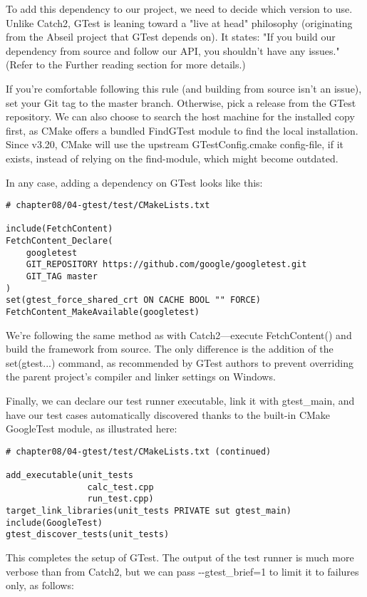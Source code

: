 To add this dependency to our project, we need to decide which version to use. Unlike Catch2, GTest is leaning toward a "live at head" philosophy (originating from the Abseil project that GTest depends on). It states: "If you build our dependency from source and follow our API, you shouldn't have any issues." (Refer to the Further reading section for more details.)

If you're comfortable following this rule (and building from source isn't an issue), set your Git tag to the master branch. Otherwise, pick a release from the GTest repository. We can also choose to search the host machine for the installed copy first, as CMake offers a bundled FindGTest module to find the local installation. Since v3.20, CMake will use the upstream GTestConfig.cmake config-file, if it exists, instead of relying on the find-module, which might become outdated.

In any case, adding a dependency on GTest looks like this:

\begin{lstlisting}[style=styleCMake]
# chapter08/04-gtest/test/CMakeLists.txt

include(FetchContent)
FetchContent_Declare(
	googletest
	GIT_REPOSITORY https://github.com/google/googletest.git
	GIT_TAG master
)
set(gtest_force_shared_crt ON CACHE BOOL "" FORCE)
FetchContent_MakeAvailable(googletest)
\end{lstlisting}

We're following the same method as with Catch2—execute FetchContent() and build the framework from source. The only difference is the addition of the set(gtest...) command, as recommended by GTest authors to prevent overriding the parent project's compiler and linker settings on Windows.

Finally, we can declare our test runner executable, link it with gtest\_main, and have our test cases automatically discovered thanks to the built-in CMake GoogleTest module, as illustrated here: 

\begin{lstlisting}[style=styleCMake]
# chapter08/04-gtest/test/CMakeLists.txt (continued)
	
add_executable(unit_tests
				calc_test.cpp
				run_test.cpp)
target_link_libraries(unit_tests PRIVATE sut gtest_main)
include(GoogleTest)
gtest_discover_tests(unit_tests)
\end{lstlisting}

This completes the setup of GTest. The output of the test runner is much more verbose than from Catch2, but we can pass -{}-gtest\_brief=1 to limit it to failures only, as follows:

